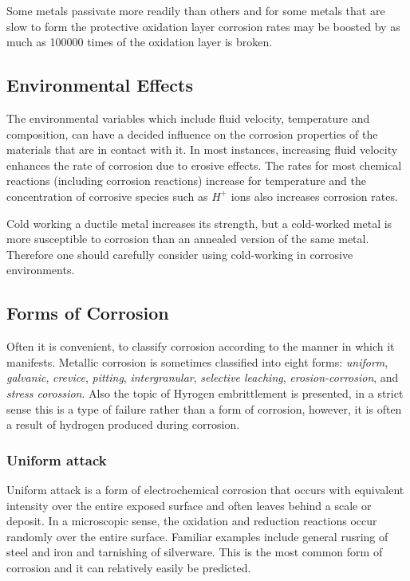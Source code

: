 Some metals passivate more readily than others and for some metals that are slow to form the protective oxidation layer corrosion rates may be boosted by as much as \num{100000} times of the oxidation layer is broken.


\subsection{Environmental Effects}
The environmental variables which include fluid velocity, temperature and composition, can have a decided influence on the corrosion properties of the materials that are in contact with it. In most instances, increasing fluid velocity enhances the rate of corrosion due to erosive effects. The rates for most chemical reactions (including corrosion reactions) increase for temperature and the concentration of corrosive species such as $H^{+}$ ions also increases corrosion rates.

Cold working a ductile metal increases its strength, but a cold-worked metal is more susceptible to corrosion than an annealed version of the same metal. Therefore one should carefully consider using cold-working in corrosive environments.


\subsection{Forms of Corrosion}
Often it is convenient, to classify corrosion according to the manner in which it manifests. Metallic corrosion is sometimes classified into eight forms: \textit{uniform}, \textit{galvanic}, \textit{crevice}, \textit{pitting}, \textit{intergranular}, \textit{selective leaching}, \textit{erosion-corrosion}, and \textit{stress corossion}. Also the topic of Hyrogen embrittlement is presented, in a strict sense this is a type of failure rather than a form of corrosion, however, it is often a result of hydrogen produced during corrosion.

\subsubsection{Uniform attack}
Uniform attack is a form of electrochemical corrosion that occurs with equivalent intensity over the entire exposed surface and often leaves behind a scale or deposit. In a microscopic sense, the oxidation and reduction reactions occur randomly over the entire surface. Familiar examples include general rusring of steel and iron and tarnishing of silverware. This is the most common form of corrosion and it can relatively easily be predicted.

